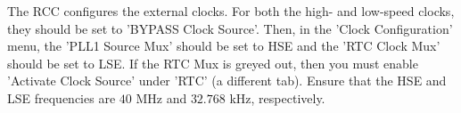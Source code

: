 The RCC configures the external clocks. For both the high- and low-speed clocks, they should be set to 'BYPASS Clock Source'.
\nl
Then, in the 'Clock Configuration' menu, the 'PLL1 Source Mux' should be set to HSE and the 'RTC Clock Mux' should be set to LSE.
If the RTC Mux is greyed out, then you must enable 'Activate Clock Source' under 'RTC' (a different tab).
Ensure that the HSE and LSE frequencies are $40$ MHz and $32.768$ kHz, respectively.